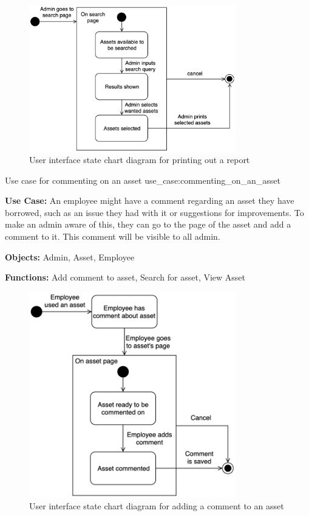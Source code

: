 \begin{figure}[H]
    \centering
    \includegraphics[width=0.8\textwidth]{figures/UseCases/UC_Print_report.png}
    \caption{User interface state chart diagram for printing out a report}
    \label{fig:print_report_statechart}
\end{figure}

    {Use case for commenting on an asset}
    {use_case:commenting_on_an_asset}
    {
        \textbf{Use Case:} An employee might have a comment regarding an asset they have borrowed, such as an issue they had with it or suggestions for improvements. To make an admin aware of this, they can go to the page of the asset and add a comment to it. This comment will be visible to all admin.
    
        \vskip 0.2cm
        
        \textbf{Objects:} Admin, Asset, Employee
        
        \vskip 0.2cm
        
        \textbf{Functions:} Add comment to asset, Search for asset, View Asset
    }

\begin{figure}[H]
    \centering
    \includegraphics[width=0.8\textwidth]{figures/UseCases/UC_Add_comment.png}
    \caption{User interface state chart diagram for adding a comment to an asset}
    \label{fig:add_comment_statechart}
\end{figure}

